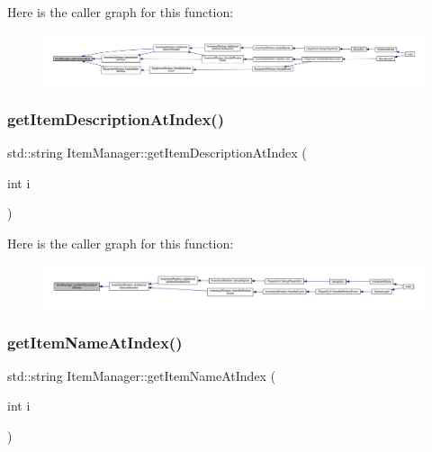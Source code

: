 Here is the caller graph for this function\+:
\nopagebreak
\begin{figure}[H]
\begin{center}
\leavevmode
\includegraphics[width=350pt]{dc/de1/class_item_manager_aba8fa0833328eacca5f55e16c5eb0fe9_icgraph}
\end{center}
\end{figure}
\mbox{\label{class_item_manager_a93049d232e7c75f23b1f1356a586372b}} 
\subsubsection{\texorpdfstring{get\+Item\+Description\+At\+Index()}{getItemDescriptionAtIndex()}}
{\footnotesize\ttfamily std\+::string Item\+Manager\+::get\+Item\+Description\+At\+Index (\begin{DoxyParamCaption}\item[{int}]{i }\end{DoxyParamCaption})}

Here is the caller graph for this function\+:
\nopagebreak
\begin{figure}[H]
\begin{center}
\leavevmode
\includegraphics[width=350pt]{dc/de1/class_item_manager_a93049d232e7c75f23b1f1356a586372b_icgraph}
\end{center}
\end{figure}
\mbox{\label{class_item_manager_a60f99805e73cc978c02b1972dd988111}} 
\subsubsection{\texorpdfstring{get\+Item\+Name\+At\+Index()}{getItemNameAtIndex()}}
{\footnotesize\ttfamily std\+::string Item\+Manager\+::get\+Item\+Name\+At\+Index (\begin{DoxyParamCaption}\item[{int}]{i }\end{DoxyParamCaption})}

